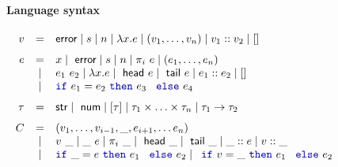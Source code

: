\documentclass[
		twoside,openright,titlepage,numbers=noenddot,headinclude,%
                footinclude=true,cleardoublepage=empty,
                BCOR=10mm,paper=a4,fontsize=10pt, %
                ngerman,american, %
                ]{scrreprt}
\newcommand{\sep}[0]{\; | \;}
\newcommand{\kvd}[1]{\textnormal{\textcolor{kvdclr}{\ttfamily #1}}}
\newcommand{\ident}[1]{\textnormal{\sffamily #1}}
\begin{document}
\begin{figure}[t]
\paragraph{Language syntax}  
\begin{equation*}
\begin{array}{rcl}
  v &  = & \ident{error} \sep s \sep n \sep \lambda x.e \sep (v_1, \ldots, v_n) \sep v_1::v_2 \sep []\\
\\[-0.5em]
  e &  = & x \sep \ident{error} \sep s \sep n \sep \pi_i~e \sep (e_1, \ldots, e_n)  \\
    &\sep& e_1~e_2 \sep \lambda x.e \sep \ident{head}~e \sep \ident{tail}~e \sep e_1 :: e_2 \sep [] \\
    &\sep& \kvd{if}~e_1 = e_2~\kvd{then}~e_3~\kvd{else}~e_4\\
\\[-0.5em]
  \tau &  = & \ident{str} \sep \ident{num} \sep [\tau] \sep \tau_1 \times \ldots \times \tau_n \sep \tau_1 \rightarrow \tau_2 \\
\\[-0.5em]
  C  & = & (v_1, \ldots, v_{i-1}, \_, e_{i+1}, \ldots e_n) \\
    &\sep& v~\_ \sep \_~e \sep \pi_i~\_ \sep \ident{head}~\_ \sep \ident{tail}~\_ \sep \_::e \sep v::\_  \\
    &\sep& \kvd{if}~\_ = e~\kvd{then}~e_1~\kvd{else}~e_2 \sep \kvd{if}~v = \_~\kvd{then}~e_1~\kvd{else}~e_2
  
\end{array}
\end{equation*}

~

\end{figure}
\end{document}
